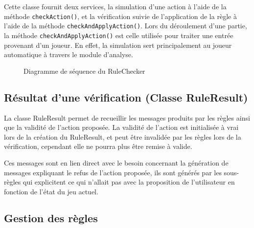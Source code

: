 \documentclass[a4paper]{report}
\begin{document}
Cette classe fournit deux services, la simulation d'une action à l'aide de la méthode {\tt checkAction()}, et la vérification suivie de l'application de la règle à l'aide de la méthode {\tt checkAndApplyAction()}. Lors du déroulement d'une partie, la méthode {\tt checkAndApplyAction()} est celle utilisée pour traiter une entrée provenant d'un joueur. En effet, la simulation sert principalement au joueur automatique à travers le module d'analyse.

\begin{figure}[!h]
\centering
{}
\caption{Diagramme de séquence du RuleChecker}\label{seq:ruleChecker}
\end{figure}

\subsection{Résultat d'une vérification (Classe RuleResult)}

La classe RuleResult permet de recueillir les messages produits par les règles ainsi que la validité de l'action proposée. La validité de l'action est initialisée à vrai lors de la création du RuleResult, et peut être invalidée par les règles lors de la vérification, cependant elle ne pourra plus être remise à valide.

Ces messages sont en lien direct avec le besoin concernant la génération de messages expliquant le refus de l'action proposée, ils sont générés par les sous-règles qui explicitent ce qui n'allait pas avec la proposition de l'utilisateur en fonction de l'état du jeu actuel.

\subsection{Gestion des règles}
\end{document}
